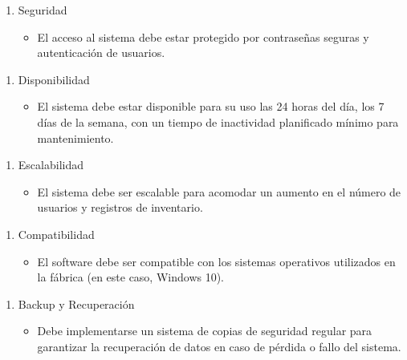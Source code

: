\documentclass{article}
\begin{document}
\clearpage
\begin{enumerate}[start=3]
	\item Seguridad
	\begin{itemize}
		\item El acceso al sistema debe estar protegido por contraseñas seguras y autenticación de usuarios.
	\end{itemize}
\end{enumerate}

\begin{enumerate}[start=4]
	\item Disponibilidad
	\begin{itemize}
		\item El sistema debe estar disponible para su uso las 24 horas del día, los 7 días de la semana, con un tiempo de inactividad planificado mínimo para mantenimiento.
	\end{itemize}
\end{enumerate}

\begin{enumerate}[start=5]
	\item Escalabilidad
	\begin{itemize}
		\item El sistema debe ser escalable para acomodar un aumento en el número de usuarios y registros de inventario.
	\end{itemize}
\end{enumerate}

\begin{enumerate}[start=6]
	\item Compatibilidad
	\begin{itemize}
		\item El software debe ser compatible con los sistemas operativos utilizados en la fábrica (en este caso, Windows 10).
	\end{itemize}
\end{enumerate}

\begin{enumerate}[start=7]
	\item Backup y Recuperación
	\begin{itemize}
		\item Debe implementarse un sistema de copias de seguridad regular para garantizar la recuperación de datos en caso de pérdida o fallo del sistema.
	\end{itemize}
\end{enumerate}
\end{document}
